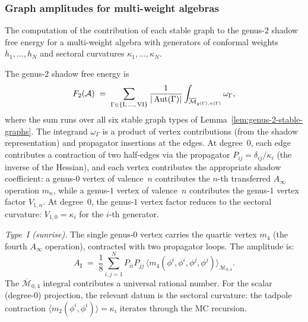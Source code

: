 \subsubsection{Graph amplitudes for multi-weight algebras}

The computation of the contribution of each stable graph to the
genus-$2$ shadow free energy for a multi-weight algebra with
generators of conformal weights $h_1, \ldots, h_N$ and sectoral
curvatures $\kappa_1, \ldots, \kappa_N$.

\begin{construction}
\label{constr:genus-2-amplitudes}
The genus-$2$ shadow free energy is
\begin{equation}\label{eq:F2-graph-sum}
F_2(\mathcal{A}) \;=\; \sum_{\Gamma \in \{\mathrm{I,\,\ldots,\,VI}\}}
\frac{1}{|\operatorname{Aut}(\Gamma)|} \int_{\overline{\mathcal{M}}_{g(\Gamma),n(\Gamma)}}
\omega_\Gamma,
\end{equation}
where the sum runs over all six stable graph types of
Lemma~\ref{lem:genus-2-stable-graphs}.
The integrand $\omega_\Gamma$ is a product of vertex
contributions (from the shadow representation) and propagator
insertions at the edges. At degree~$0$, each edge contributes a
contraction of two half-edges via the propagator
$P_{ij} = \delta_{ij}/\kappa_i$ (the inverse of the Hessian),
and each vertex contributes the appropriate shadow coefficient:
a genus-$0$ vertex of valence~$n$ contributes the $n$-th
transferred $A_\infty$ operation $m_n$, while a genus-$1$
vertex of valence~$n$ contributes the genus-$1$ vertex factor
$V_{1,n}$. At degree~$0$, the genus-$1$ vertex factor reduces
to the sectoral curvature: $V_{1,0} = \kappa_i$ for the
$i$-th generator.

\medskip\noindent
\emph{Type~I (sunrise).} The single genus-$0$ vertex carries the
quartic vertex $m_4$ (the fourth $A_\infty$ operation),
contracted with two propagator loops. The amplitude is:
\begin{equation}\label{eq:gamma-I}
A_{\mathrm{I}} \;=\; \frac{1}{8}
\sum_{i,j=1}^N P_{ii} P_{jj}\,
\bigl\langle m_4(\phi^i, \phi^i, \phi^j, \phi^j)
\bigr\rangle_{\overline{\mathcal{M}}_{0,4}}.
\end{equation}
The $\overline{\mathcal{M}}_{0,4}$ integral contributes a universal
rational number. For the scalar (degree-$0$) projection,
the relevant datum is the sectoral curvature: the tadpole
contraction $\langle m_2(\phi^i, \phi^i) \rangle = \kappa_i$
iterates through the MC recursion.


\end{construction}
